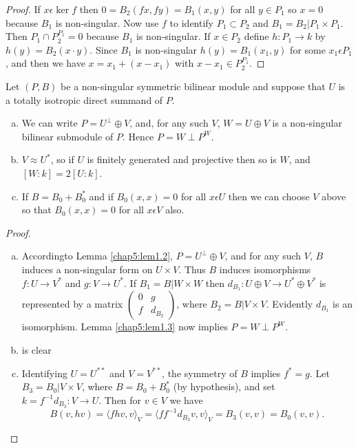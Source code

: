 \begin{proof}
If $x \epsilon \ker f$ then $0 = B_2 (fx, fy) = B_1(x, y)$ for all $y
\in P_1$ so $x =0$ because $B_1$ is non-singular. Now use $f$ to
identify $P_1 \subset P_2$ and $B_1 = B_2 |P_1 \times P_1$. Then $P_1
\cap P^{P_1}_2 = 0$ because $B_1$ is non-singular. If $x \in P_2$
define $h: P_1 \to k$ by $h(y) = B_2 (x \cdot y)$. Since $B_1$ is
non-singular $h(y) = B_1(x_1, y)$ for some $x_1 \epsilon P_1$, and
then we have $x = x_1 + (x-x_1)$ with $x-x_1 \in P^{P_1}_2$. 
\end{proof}

\begin{lemma}\label{chap5:lem1.4}%
 Let $(P, B)$ be a non-singular symmetric bilinear module and suppose
 that $U$ is a totally isotropic direct summand of $P$. 
\begin{enumerate}[(a)]
\item  We can write $P = U^\perp \oplus V$, and, for any such $V$, $W
  =U \oplus V$ is a non-singular bilinear submodule of $P$. Hence $P =
  W \perp P^W$.

\item $V \approx U^\ast$, so if $U$ is finitely generated and projective
  then so is $W$, and $[W : k] =2[U : k]$. 

\item  If $ B = B_0 + B^\ast_0$ and if $B_0 (x, x) = 0$ for all $x
  \epsilon U$ then we can choose $V$ above so that $B_0 (x, x) =0$ for
  all $x \epsilon V$ also. 
\end{enumerate}
\end{lemma}

\begin{proof}%
\begin{enumerate}[(a)]
\item According\pageoriginale to Lemma \ref{chap5:lem1.2}, $P =
  U^\perp \oplus V$, 
  and for any such 
  $V$, $B$ induces a non-singular form on $U \times V$. Thus $B$
  induces isomorphisms $f: U \to V^*$ and $g: V \to U^*$. If $B_1
  = B|W \times W$ then $d_{B_1}: U \oplus V \to U^* \oplus V^*$ is
  represented by a matrix $\left( \begin{smallmatrix} 0 & g \\ f &
    d_{B_2} \end{smallmatrix} \right)$, where $B_2 = B|V \times
  V$. Evidently $d_{B_1}$ is an isomorphism. Lemma \ref{chap5:lem1.3}
  now implies $P   = W \perp P^W$. 

\item is clear

\item Identifying $U = U^{\ast \ast}$ and $V=V^{\ast\ast}$, the symmetry of $B$
  implies $f^\ast = g$. Let $B_3 = B_0 | V \times V$, where $B = B_0 +
  B^\ast_0$ (by hypothesis), and set $k = f^{-1} d_{B_3}: V \to
  U$. Then for $v \in V$ we have  
$$
B(v, hv)= \langle fhv, v \rangle_V = \langle ff^{-1} d_{B_3} v, v 
\rangle_V = B_3 (v, v) = B_0 (v, v). 
$$
\end{enumerate}
\end{proof}

